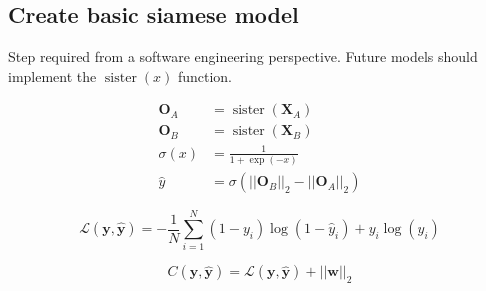 \subsection{Create basic siamese model}
\begin{frame}{\insertsubsec}
  Step required from a software engineering perspective. Future models should implement the 
  \( \operatorname{sister}(x) \) function.

  \begin{align*}
    \bm{O}_A &= \operatorname{sister}(\bm{X}_A) \\
    \bm{O}_B &= \operatorname{sister}(\bm{X}_B) \\
    \sigma(x) &= \frac{1}{1 + \exp(-x)} \\
    \hat{y} &= \sigma(||\bm{O}_B||_2 - ||\bm{O}_A||_2) 
  \end{align*}

  \[
    \mathcal{L}(\bm{y}, \hat{\bm{y}}) = -\frac{1}{N} \sum_{i = 1}^{N}
    (1 - y_i)\log(1 - \hat{y}_i) + y_i\log(\hat{y}_i)
  \]

  \[
    C(\bm{y}, \hat{\bm{y}}) = \mathcal{L}(\bm{y}, \hat{\bm{y}}) + 
    ||\bm{w}||_2
  \]
\end{frame}

